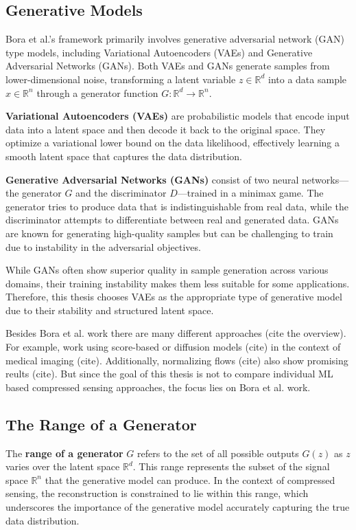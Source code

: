 \subsection{Generative Models}

Bora et al.'s framework primarily involves generative adversarial network (GAN) type models, including Variational Autoencoders (VAEs) and Generative Adversarial Networks (GANs).
Both VAEs and GANs generate samples from lower-dimensional noise, transforming a latent variable $z \in \mathbb{R}^d$ into a data sample $x \in \mathbb{R}^n$ through a generator function $G: \mathbb{R}^d \to \mathbb{R}^n$.

\textbf{Variational Autoencoders (VAEs)} are probabilistic models that encode input data into a latent space and then decode it back to the original space.
They optimize a variational lower bound on the data likelihood, effectively learning a smooth latent space that captures the data distribution.

\textbf{Generative Adversarial Networks (GANs)} consist of two neural networks—the generator $G$ and the discriminator $D$—trained in a minimax game.
The generator tries to produce data that is indistinguishable from real data, while the discriminator attempts to differentiate between real and generated data.
GANs are known for generating high-quality samples but can be challenging to train due to instability in the adversarial objectives.

While GANs often show superior quality in sample generation across various domains, their training instability makes them less suitable for some applications.
Therefore, this thesis chooses VAEs as the appropriate type of generative model due to their stability and structured latent space.

Besides Bora et al. work there are many different approaches (cite the overview).
For example, work using score-based or diffusion models (cite) in the context of medical imaging (cite).
Additionally, normalizing flows (cite) also show promising reults (cite).
But since the goal of this thesis is not to compare individual ML based compressed sensing approaches, the focus lies on Bora et al. work.

\subsection{The Range of a Generator}

The \textbf{range of a generator} $G$ refers to the set of all possible outputs $G(z)$ as $z$ varies over the latent space $\mathbb{R}^d$.
This range represents the subset of the signal space $\mathbb{R}^n$ that the generative model can produce.
In the context of compressed sensing, the reconstruction is constrained to lie within this range, which underscores the importance of the generative model accurately capturing the true data distribution.

